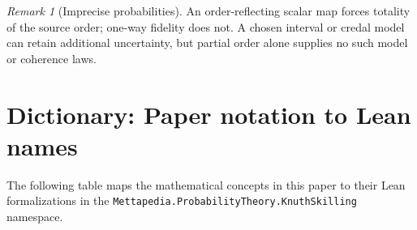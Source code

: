 \documentclass[11pt]{article}
\theoremstyle{definition}
\theoremstyle{remark}
\newtheorem{remark}[theorem]{Remark}
\begin{document}
\begin{remark}[Imprecise probabilities]
An order-reflecting scalar map forces totality of the source order; one-way
fidelity does not. A chosen interval or credal model can retain additional
uncertainty, but partial order alone supplies no such model or coherence laws.
\end{remark}

\appendix

\section{Dictionary: Paper notation to Lean names}

The following table maps the mathematical concepts in this paper to their Lean formalizations
in the \texttt{Mettapedia.ProbabilityTheory.KnuthSkilling} namespace.
\end{document}
